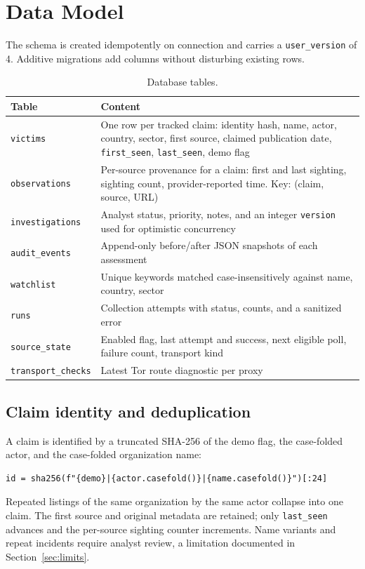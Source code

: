 \documentclass[11pt,a4paper]{article}
\newcommand{\code}[1]{\texttt{\small #1}}
\begin{document}
\section{Data Model}
The schema is created idempotently on connection and carries a \code{user\_version} of 4. Additive migrations add columns without disturbing existing rows.

\begin{table}[H]
\centering
\renewcommand{\arraystretch}{1.2}
\begin{tabularx}{\linewidth}{@{}l X@{}}
\toprule
\textbf{Table} & \textbf{Content} \\
\midrule
\code{victims} & One row per tracked claim: identity hash, name, actor, country, sector, first source, claimed publication date, \code{first\_seen}, \code{last\_seen}, demo flag \\
\code{observations} & Per-source provenance for a claim: first and last sighting, sighting count, provider-reported time. Key: (claim, source, URL) \\
\code{investigations} & Analyst status, priority, notes, and an integer \code{version} used for optimistic concurrency \\
\code{audit\_events} & Append-only before/after JSON snapshots of each assessment \\
\code{watchlist} & Unique keywords matched case-insensitively against name, country, sector \\
\code{runs} & Collection attempts with status, counts, and a sanitized error \\
\code{source\_state} & Enabled flag, last attempt and success, next eligible poll, failure count, transport kind \\
\code{transport\_checks} & Latest Tor route diagnostic per proxy \\
\bottomrule
\end{tabularx}
\caption{Database tables.}
\end{table}

\subsection{Claim identity and deduplication}
A claim is identified by a truncated SHA-256 of the demo flag, the case-folded actor, and the case-folded organization name:
\begin{lstlisting}
id = sha256(f"{demo}|{actor.casefold()}|{name.casefold()}")[:24]
\end{lstlisting}
Repeated listings of the same organization by the same actor collapse into one claim. The first source and original metadata are retained; only \code{last\_seen} advances and the per-source sighting counter increments. Name variants and repeat incidents require analyst review, a limitation documented in Section~\ref{sec:limits}.
\end{document}
